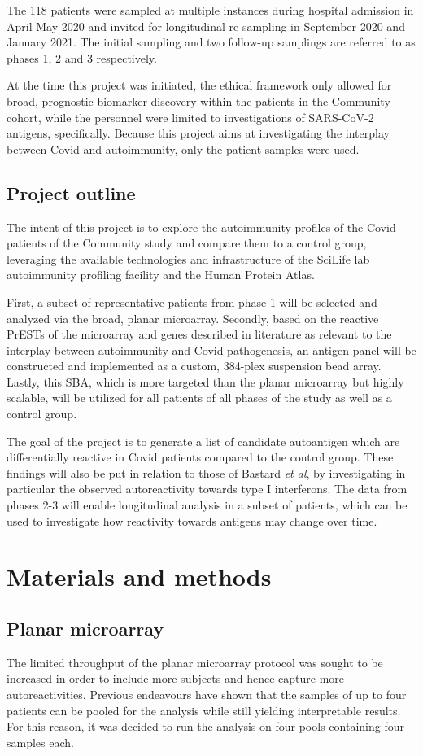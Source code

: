 \documentclass{article}
\begin{document}
The 118 patients were sampled at multiple instances during hospital admission in April-May 2020 and invited for longitudinal re-sampling in September 2020 and January 2021. The initial sampling and two follow-up samplings are referred to as phases 1, 2 and 3 respectively.

At the time this project was initiated, the ethical framework only allowed for broad, prognostic biomarker discovery within the patients in the Community cohort, while the personnel were limited to investigations of SARS-CoV-2 antigens, specifically. Because this project aims at investigating the interplay between Covid and autoimmunity, only the patient samples were used.

\subsection{Project outline}
The intent of this project is to explore the autoimmunity profiles of the Covid patients of the Community study and compare them to a control group, leveraging the available technologies and infrastructure of the SciLife lab autoimmunity profiling facility and the Human Protein Atlas.

First, a subset of representative patients from phase 1 will be selected and analyzed via the broad, planar microarray. Secondly, based on the reactive PrESTs of the microarray and genes described in literature as relevant to the interplay between autoimmunity and Covid pathogenesis, an antigen panel will be constructed and implemented as a custom, 384-plex suspension bead array. Lastly, this SBA, which is more targeted than the planar microarray but highly scalable, will be utilized for all patients of all phases of the study as well as a control group.

The goal of the project is to generate a list of candidate autoantigen which are differentially reactive in Covid patients compared to the control group. These findings will also be put in relation to those of Bastard \textit{et al}, by investigating in particular the observed autoreactivity towards type I interferons. The data from phases 2-3 will enable longitudinal analysis in a subset of patients, which can be used to investigate how reactivity towards antigens may change over time.

\section{Materials and methods}
\subsection{Planar microarray}\label{method_42}
The limited throughput of the planar microarray protocol was sought to be increased in order to include more subjects and hence capture more autoreactivities. Previous endeavours have shown that the samples of up to four patients can be pooled for the analysis while still yielding interpretable results. For this reason, it was decided to run the analysis on four pools containing four samples each.
\end{document}
